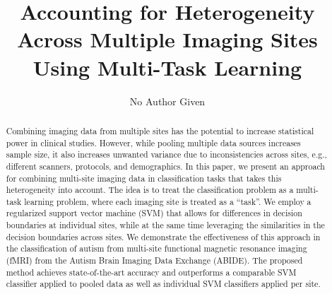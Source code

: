\documentclass{llncs}
\begin{document}
\pagestyle{plain}

\mainmatter

\title{Accounting for Heterogeneity Across Multiple Imaging Sites Using Multi-Task Learning}
%
%
\author{No Author Given}

\maketitle

\begin{abstract}
Combining imaging data from multiple sites has the potential to increase statistical power in clinical studies. However, while pooling multiple data sources increases sample size, it also increases unwanted variance due to inconsistencies across sites, e.g., different scanners, protocols, and demographics. In this paper, we present an approach for combining multi-site imaging data in classification tasks that takes this heterogeneity into account. The idea is to treat the classification problem as a multi-task learning problem, where each imaging site is treated as a ``task''. We employ a regularized support vector machine (SVM) that allows for differences in decision boundaries at individual sites, while at the same time leveraging the similarities in the decision boundaries across sites. We demonstrate the effectiveness of this approach in the classification of autism from multi-site functional magnetic resonance imaging (fMRI) from the Autism Brain Imaging Data Exchange (ABIDE). The proposed method achieves state-of-the-art accuracy and outperforms a comparable SVM classifier applied to pooled data as well as individual SVM classifiers applied per site.

\end{abstract}
\end{document}
